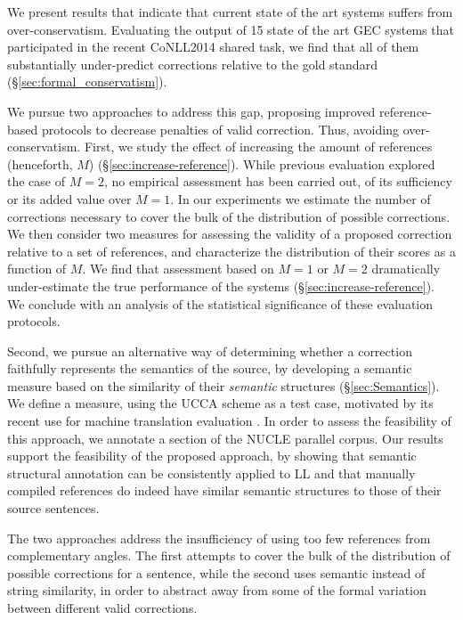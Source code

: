 	We present results that indicate that current state of the art systems suffers
	from over-conservatism. Evaluating the output of 15 state
	of the art GEC systems that participated
	in the recent CoNLL2014 shared task, we find that all of them
	substantially under-predict corrections relative to the gold standard
	(\S\ref{sec:formal_conservatism}). 
	
	We pursue two approaches to address this gap, proposing
	improved reference-based protocols to decrease penalties of valid correction. Thus, avoiding over-conservatism.
	First, we study the effect of increasing the amount of references
	(henceforth, $M$) (\S\ref{sec:increase-reference}).
	While previous evaluation explored the case of $M=2$,
	no empirical assessment has been carried out, of its sufficiency
	or its added value over $M=1$.
	In our experiments we estimate the number of corrections necessary
	to cover the bulk of the distribution of possible corrections.
	We then consider two measures for
	assessing the validity of a proposed correction relative to a set of references,
	and characterize the distribution of their scores as a function of $M$.
	We find that assessment based on $M=1$ or $M=2$ dramatically under-estimate
	the true performance of the systems (\S\ref{sec:increase-reference}). 
	We conclude with an analysis of
	the statistical significance of these evaluation protocols.
	
	Second, we pursue an alternative way of determining whether a correction faithfully
	represents the semantics of the source, by developing a semantic measure based
	on the similarity of their {\it semantic} structures (\S\ref{sec:Semantics}).
	We define a measure, using the UCCA scheme \cite{abend2013universal} as a
	test case, motivated by its recent use for machine translation
	evaluation \cite{birch2016hume}.
	In order to assess the feasibility of this approach, we annotate a
	section of the NUCLE \cite{dahlmeier2013building}
	parallel corpus. Our results support the feasibility of the proposed approach,
	by showing that semantic structural annotation can be consistently applied
	to LL and that manually compiled references do indeed
	have similar semantic structures to those of their source sentences.
	
	The two approaches address the insufficiency of using too few references from
	complementary angles. 
	The first attempts to cover the bulk of the distribution of possible
	corrections for a sentence, while the second
	uses semantic instead of string similarity, in order to abstract away
	from some of the formal variation between different valid corrections.
	
